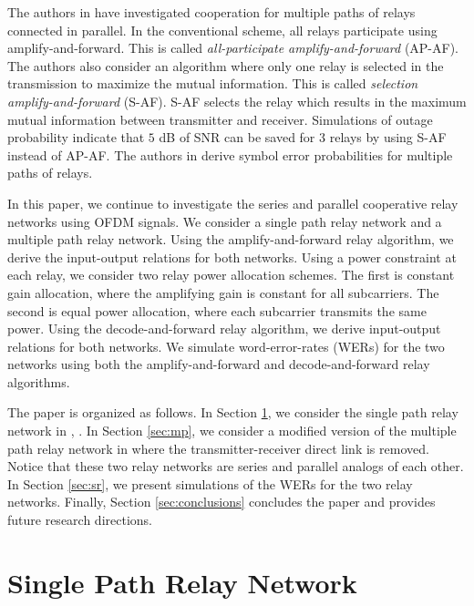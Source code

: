 \documentclass[conference]{IEEEtran}
\begin{document}
The authors in \cite{article:Adve01} have investigated cooperation for multiple paths of relays connected in parallel.  In the conventional scheme, all relays participate using amplify-and-forward.  This is called \emph{all-participate amplify-and-forward} (AP-AF).  The authors also consider an algorithm where only one relay is selected in the transmission to maximize the mutual information.  This is called \emph{selection amplify-and-forward} (S-AF).  S-AF selects the relay which results in the maximum mutual information between transmitter and receiver.  Simulations of outage probability indicate that $5$ dB of SNR can be saved for 3 relays by using S-AF instead of AP-AF.  The authors in \cite{article:Ribeiro01} derive symbol error probabilities for multiple paths of relays.

In this paper, we continue to investigate the series and parallel cooperative relay networks using OFDM signals.  We consider a single path relay network and a multiple path relay network.  Using the amplify-and-forward relay algorithm, we derive the input-output relations for both networks.  Using a power constraint at each relay, we consider two relay power allocation schemes.  The first is constant gain allocation, where the amplifying gain is constant for all subcarriers.  The second is equal power allocation, where each subcarrier transmits the same power.  Using the decode-and-forward relay algorithm, we derive input-output relations for both networks.  We simulate word-error-rates (WERs) for the two networks using both the amplify-and-forward and decode-and-forward relay algorithms.

The paper is organized as follows.  In Section \ref{sec:sp}, we consider the single path relay network in \cite{article:Hasna02}, \cite{article:Hasna01}.  In Section \ref{sec:mp}, we consider a modified version of the multiple path relay network in \cite{article:Adve01} where the transmitter-receiver direct link is removed.  Notice that these two relay networks are series and parallel analogs of each other.  In Section \ref{sec:sr}, we present simulations of the WERs for the two relay networks.  Finally, Section \ref{sec:conclusions} concludes the paper and provides future research directions.

\section{Single Path Relay Network}
\label{sec:sp}
\end{document}
